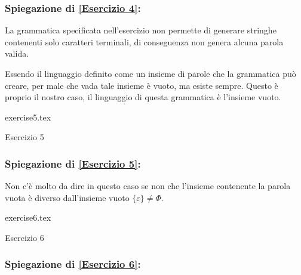 \documentclass[class=book, crop=false, oneside]{standalone}
\begin{document}
\subsubsection*{Spiegazione di \ref{Esercizio 4}:}
La grammatica specificata nell'esercizio non permette di generare stringhe contenenti solo caratteri terminali, di conseguenza non genera alcuna parola valida.

Essendo il linguaggio definito come un insieme di parole che la grammatica può creare, per male che vada tale insieme è vuoto, ma esiste sempre. Questo è proprio il nostro caso, il linguaggio di questa grammatica è l’insieme vuoto.

\begin{table}[H]
	\centering
	{exercise5.tex}
    \caption{Esercizio 5}
    \label{Esercizio 5}
\end{table}
\subsubsection*{Spiegazione di \ref{Esercizio 5}:}
Non c'è molto da dire in questo caso se non che l’insieme contenente la parola vuota è diverso dall’insieme vuoto $\{\varepsilon\} \neq \Phi$.

\begin{table}[H]
	\centering
	{exercise6.tex}
    \caption{Esercizio 6}
    \label{Esercizio 6}
\end{table}
\subsubsection*{Spiegazione di \ref{Esercizio 6}:}
\end{document}
